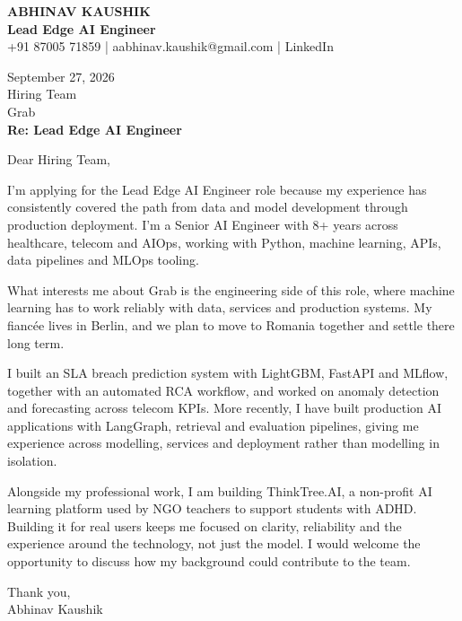 \documentclass[10pt,a4paper]{article}
\begin{document}
\begin{center}
{\Large\bfseries ABHINAV KAUSHIK}\\[2pt]
{\bfseries Lead Edge AI Engineer}\\[2pt]
+91 87005 71859 \quad | \quad aabhinav.kaushik@gmail.com \quad | \quad LinkedIn
\end{center}
\vspace{8pt}
September 27, 2026\\[6pt]
Hiring Team\\
Grab\\[4pt]
\textbf{Re: Lead Edge AI Engineer}

Dear Hiring Team,

I’m applying for the Lead Edge AI Engineer role because my experience has consistently covered the path from data and model development through production deployment. I’m a Senior AI Engineer with 8+ years across healthcare, telecom and AIOps, working with Python, machine learning, APIs, data pipelines and MLOps tooling.

What interests me about Grab is the engineering side of this role, where machine learning has to work reliably with data, services and production systems. My fiancée lives in Berlin, and we plan to move to Romania together and settle there long term.

I built an SLA breach prediction system with LightGBM, FastAPI and MLflow, together with an automated RCA workflow, and worked on anomaly detection and forecasting across telecom KPIs. More recently, I have built production AI applications with LangGraph, retrieval and evaluation pipelines, giving me experience across modelling, services and deployment rather than modelling in isolation.

Alongside my professional work, I am building ThinkTree.AI, a non-profit AI learning platform used by NGO teachers to support students with ADHD. Building it for real users keeps me focused on clarity, reliability and the experience around the technology, not just the model. I would welcome the opportunity to discuss how my background could contribute to the team.

Thank you,\\
Abhinav Kaushik
\end{document}
